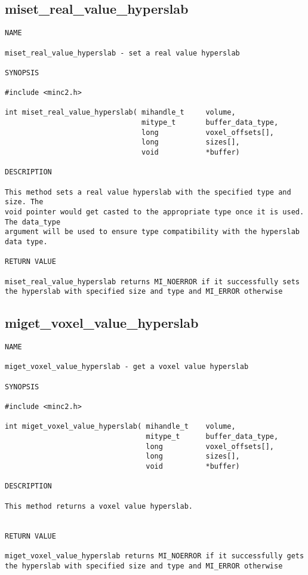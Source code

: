 \documentclass{article}
\begin{document}
\subsection{miset\_real\_value\_hyperslab}
\begin{verbatim}
NAME

miset_real_value_hyperslab - set a real value hyperslab

SYNOPSIS

#include <minc2.h>

int miset_real_value_hyperslab( mihandle_t     volume,
                                mitype_t       buffer_data_type,
                                long           voxel_offsets[],
                                long           sizes[],
                                void           *buffer)

DESCRIPTION

This method sets a real value hyperslab with the specified type and size. The 
void pointer would get casted to the appropriate type once it is used. The data_type
argument will be used to ensure type compatibility with the hyperslab data type. 

RETURN VALUE

miset_real_value_hyperslab returns MI_NOERROR if it successfully sets
the hyperslab with specified size and type and MI_ERROR otherwise
\end{verbatim}

\subsection{miget\_voxel\_value\_hyperslab}
\begin{verbatim}
NAME

miget_voxel_value_hyperslab - get a voxel value hyperslab

SYNOPSIS

#include <minc2.h>

int miget_voxel_value_hyperslab( mihandle_t    volume,
                                 mitype_t      buffer_data_type,
                                 long          voxel_offsets[],
                                 long          sizes[],
                                 void          *buffer)

DESCRIPTION

This method returns a voxel value hyperslab.


RETURN VALUE

miget_voxel_value_hyperslab returns MI_NOERROR if it successfully gets 
the hyperslab with specified size and type and MI_ERROR otherwise
\end{verbatim}
\end{document}
